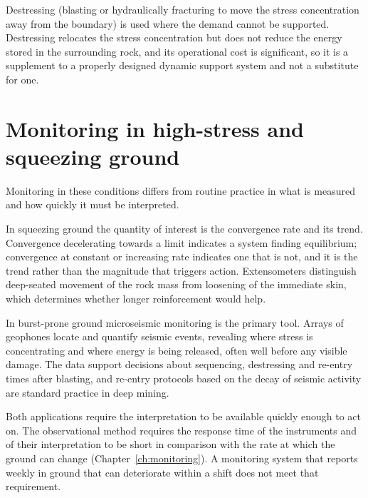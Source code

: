 Destressing (blasting or hydraulically fracturing to move the stress
concentration away from the boundary) is used where the demand cannot be
supported. Destressing relocates the stress concentration but does not reduce
the energy stored in the surrounding rock, and its operational cost is
significant, so it is a supplement to a properly designed dynamic support
system and not a substitute for one.

\section{Monitoring in high-stress and squeezing ground}
\label{sec:high-stress-monitoring}

Monitoring in these conditions differs from routine practice in what is
measured and how quickly it must be interpreted.

In squeezing ground the quantity of interest is the convergence rate and its
trend. Convergence decelerating towards a limit indicates a system finding
equilibrium; convergence at constant or increasing rate indicates one that is
not, and it is the trend rather than the magnitude that triggers action.
Extensometers distinguish deep-seated movement of the rock mass from
loosening of the immediate skin, which determines whether longer reinforcement
would help.

In burst-prone ground microseismic monitoring is the primary tool. Arrays of
geophones locate and quantify seismic events, revealing where stress is
concentrating and where energy is being released, often well before any
visible damage. The data support decisions about sequencing, destressing and
re-entry times after blasting, and re-entry protocols based on the decay of
seismic activity are standard practice in deep mining.

Both applications require the interpretation to be available
quickly enough to act on. The observational method requires
the response time of the instruments and of their interpretation to be short
in comparison with the rate at which the ground can change
(Chapter~\ref{ch:monitoring}). A monitoring system that reports weekly in
ground that can deteriorate within a shift does not meet that requirement.

\chapterreferences
